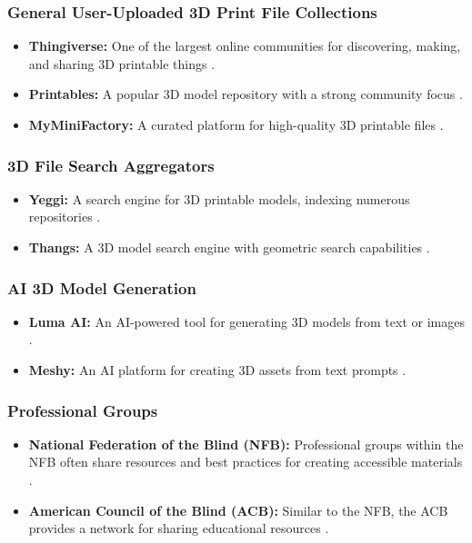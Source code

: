\subsubsection{General User-Uploaded 3D Print File Collections}
\begin{itemize}
	\item \textbf{Thingiverse:} One of the largest online communities for discovering, making, and sharing 3D printable things \supercite{Thingiverse}.
	\item \textbf{Printables:} A popular 3D model repository with a strong community focus \supercite{Printables}.
	\item \textbf{MyMiniFactory:} A curated platform for high-quality 3D printable files \supercite{MyMiniFactory}.
\end{itemize}

\subsubsection{3D File Search Aggregators}
\begin{itemize}
	\item \textbf{Yeggi:} A search engine for 3D printable models, indexing numerous repositories \supercite{Yeggi}.
	\item \textbf{Thangs:} A 3D model search engine with geometric search capabilities \supercite{Thangs}.
\end{itemize}

\subsubsection{AI 3D Model Generation}
\begin{itemize}
	\item \textbf{Luma AI:} An AI-powered tool for generating 3D models from text or images \supercite{LumaAI}.
	\item \textbf{Meshy:} An AI platform for creating 3D assets from text prompts \supercite{Meshy}.
\end{itemize}

\subsubsection{Professional Groups}
\begin{itemize}
	\item \textbf{National Federation of the Blind (NFB):} Professional groups within the NFB often share resources and best practices for creating accessible materials \supercite{NFB}.
	\item \textbf{American Council of the Blind (ACB):} Similar to the NFB, the ACB provides a network for sharing educational resources \supercite{ACB}.
\end{itemize}

